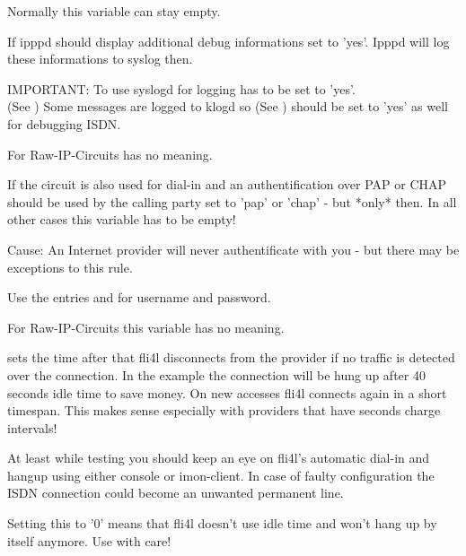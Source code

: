 \begin{description}
  Normally this variable can stay empty.

  
  If ipppd should display additional debug informations set 
   to 'yes'. Ipppd will log
  these informations to syslog then.
  
  IMPORTANT: To use syslogd for logging  has to be set to 'yes'.\\
  (See )
  Some messages are logged to klogd so  
  (See )
  should be set to 'yes' as well for debugging ISDN.
  
  For Raw-IP-Circuits  has no meaning.

  
  If the circuit is also used for dial-in and an authentification over 
  PAP or CHAP should be used by the calling party set 
   to 'pap' or 'chap' - but *only* then. 
  In all other cases this variable has to be empty!
  
  Cause: An Internet provider will never authentificate with you - but 
  there may be exceptions to this rule.
  
  Use the entries  and 
  for username and password.

  For Raw-IP-Circuits this variable has no meaning.

  
   sets the time after that 
  fli4l disconnects from the provider if no traffic is detected over 
  the connection. In the example the connection will be hung up after 
  40 seconds idle time to save money. On new accesses fli4l connects 
  again in a short timespan. This makes sense especially with providers 
  that have seconds charge intervals!
  
  At least while testing you should keep an eye on fli4l's automatic 
  dial-in and hangup using either console or imon-client. In case of 
  faulty configuration the ISDN connection could become an unwanted 
  permanent line.
  
  Setting this to '0' means that fli4l doesn't use idle time and won't hang 
  up by itself anymore. Use with care!
  

\end{description}
